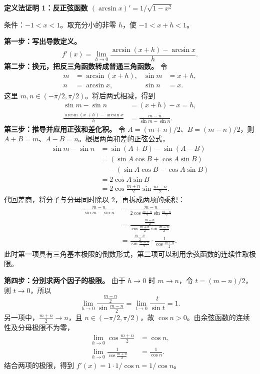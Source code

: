 \begin{proofbox}
\medskip
\textbf{定义法证明 1：反正弦函数 $(\arcsin x)'=1/\sqrt{1-x^2}$}

条件：$-1<x<1$。取充分小的非零 $h$，使 $-1<x+h<1$。

\textbf{第一步：写出导数定义。}
\[
f'(x)=\lim_{h\to0}\frac{\arcsin(x+h)-\arcsin x}{h}.
\]
\textbf{第二步：换元，把反三角函数转成普通三角函数。} 令
\[
\begin{aligned}
m&=\arcsin(x+h),&\sin m&=x+h,\\
n&=\arcsin x,&\sin n&=x.
\end{aligned}
\]
这里 $m,n\in(-\pi/2,\pi/2)$。将后两式相减，得到
\[
\begin{aligned}
\sin m-\sin n&=(x+h)-x=h,\\
\frac{\arcsin(x+h)-\arcsin x}{h}
&=\frac{m-n}{\sin m-\sin n}.
\end{aligned}
\]
\textbf{第三步：推导并应用正弦和差化积。} 令 $A=(m+n)/2$、$B=(m-n)/2$，则 $A+B=m$、$A-B=n$。根据两角和差的正弦公式，
\[
\begin{aligned}
\sin m-\sin n
&=\sin(A+B)-\sin(A-B)\\
&=(\sin A\cos B+\cos A\sin B)\\
&\quad-(\sin A\cos B-\cos A\sin B)\\
&=2\cos A\sin B\\
&=2\cos\frac{m+n}{2}\sin\frac{m-n}{2}.
\end{aligned}
\]
代回差商，将分子与分母同时除以 $2$，再拆成两项的乘积：
\[
\begin{aligned}
\frac{m-n}{\sin m-\sin n}
&=\frac{m-n}{2\cos\frac{m+n}{2}\sin\frac{m-n}{2}}\\[4pt]
&=\frac{\frac{m-n}{2}}{\cos\frac{m+n}{2}\sin\frac{m-n}{2}}\\[4pt]
&=\frac{\frac{m-n}{2}}{\sin\frac{m-n}{2}}
\cdot\frac{1}{\cos\frac{m+n}{2}}.
\end{aligned}
\]
此时第一项具有三角基本极限的倒数形式，第二项可以利用余弦函数的连续性取极限。

\textbf{第四步：分别求两个因子的极限。} 由于 $h\to0$ 时 $m\to n$，令 $t=(m-n)/2$，则 $t\to0$，所以
\[
\lim_{h\to0}\frac{\frac{m-n}{2}}{\sin\frac{m-n}{2}}
=\lim_{t\to0}\frac{t}{\sin t}=1.
\]
另一项中，$\frac{m+n}{2}\to n$，且 $n\in(-\pi/2,\pi/2)$，故 $\cos n>0$。由余弦函数的连续性及分母极限不为零，
\[
\begin{aligned}
\lim_{h\to0}\cos\frac{m+n}{2}&=\cos n,\\
\lim_{h\to0}\frac{1}{\cos\frac{m+n}{2}}&=\frac1{\cos n}.
\end{aligned}
\]
结合两项的极限，得到 $f'(x)=1\cdot1/\cos n=1/\cos n$。


\end{proofbox}
